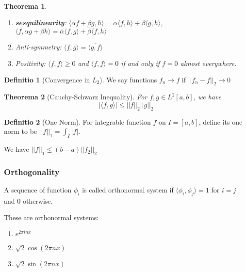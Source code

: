 \documentclass[12pt, a4paper]{article}
\newtheorem{theorem}{Theorema}
\theoremstyle{definition}
\newtheorem{definition}{Definitio}
\theoremstyle{remark}
\begin{document}
\begin{theorem}
	\begin{enumerate}
		\item \textbf{sesquilinearity}: $\langle \alpha f + \beta g, h \rangle = \alpha \langle f, h \rangle + \beta \langle g, h \rangle$, $\langle f, \alpha g + \beta h \rangle = \overline{\alpha} \langle f, g \rangle + \overline{\beta} \langle f, h \rangle$
		\item Anti-symmetry: $\langle f, g \rangle = \overline{\langle g, f \rangle}$
		\item Positivity: $\langle f, f \rangle \geq 0$ and $\langle f, f \rangle = 0$ if and only if $f = 0$ almost everywhere.
	\end{enumerate}
\end{theorem}

\begin{definition}[Convergence in $L_2$]
	We say functions $f_n \rightarrow f$ if $||f_n -f ||_2 \rightarrow 0$
\end{definition}

\begin{theorem}[Cauchy-Schwarz Inequality]
	For $f,g \in L^2[a,b]$, we have
	\begin{equation}
		|\langle f, g \rangle| \leq ||f||_2 ||g||_2
	\end{equation}
\end{theorem}

\begin{definition}[One Norm]
	For integrable function $f$ on $I = [a,b]$, define its one norm to be $||f||_1 = \int_I |f|$.

	We have $||f||_1 \leq (b-a) ||f_2||_2$
\end{definition}

\subsubsection{Orthogonality}

A sequence of function $\phi_i$ is called orthonormal system if $\langle \phi_i, \phi_j \rangle = 1$ for $i = j$ and $0 $ otherwise.

These are orthonormal systems:
\begin{enumerate}
	\item $e^{2\pi i nx}$
	\item $\sqrt{2} \cos(2 \pi nx)$
	\item $\sqrt{2} \sin(2 \pi nx)$
\end{enumerate}
\end{document}
